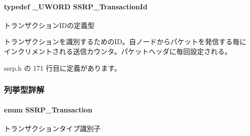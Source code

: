 \paragraph[{S\+S\+R\+P\+\_\+\+Transaction\+Id}]{\setlength{\rightskip}{0pt plus 5cm}typedef {\bf \+\_\+\+U\+W\+O\+R\+D} {\bf S\+S\+R\+P\+\_\+\+Transaction\+Id}}\label{ssrp_8h_a4ffad5beeb1efa21afe8cd4070a9bdf8_a4ffad5beeb1efa21afe8cd4070a9bdf8}


トランザクション\+I\+Dの定義型 

トランザクションを識別するための\+I\+D。自ノードからパケットを発信する毎に インクリメントされる送信カウンタ。パケットヘッダに毎回設定される。 

 ssrp.\+h の 171 行目に定義があります。



\subsubsection{列挙型詳解}
\paragraph[{S\+S\+R\+P\+\_\+\+Transaction}]{\setlength{\rightskip}{0pt plus 5cm}enum {\bf S\+S\+R\+P\+\_\+\+Transaction}}\label{ssrp_8h_a97957e4b5b03d11a84ca43c725d2ec75_a97957e4b5b03d11a84ca43c725d2ec75}


トランザクションタイプ識別子 

